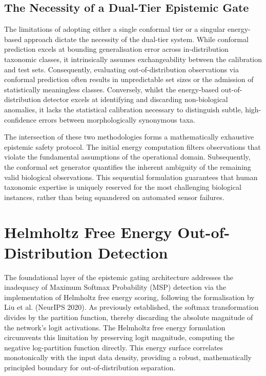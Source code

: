 \subsection{The Necessity of a Dual-Tier Epistemic Gate}

The limitations of adopting either a single conformal tier or a singular energy-based approach dictate the necessity of the dual-tier system. While conformal prediction excels at bounding generalisation error across in-distribution taxonomic classes, it intrinsically assumes exchangeability between the calibration and test sets. Consequently, evaluating out-of-distribution observations via conformal prediction often results in unpredictable set sizes or the admission of statistically meaningless classes. Conversely, whilst the energy-based out-of-distribution detector excels at identifying and discarding non-biological anomalies, it lacks the statistical calibration necessary to distinguish subtle, high-confidence errors between morphologically synonymous taxa.

The intersection of these two methodologies forms a mathematically exhaustive epistemic safety protocol. The initial energy computation filters observations that violate the fundamental assumptions of the operational domain. Subsequently, the conformal set generator quantifies the inherent ambiguity of the remaining valid biological observations. This sequential formulation guarantees that human taxonomic expertise is uniquely reserved for the most challenging biological instances, rather than being squandered on automated sensor failures.

\section{Helmholtz Free Energy Out-of-Distribution Detection}
\label{sec:helmholtz_energy_ood}

The foundational layer of the epistemic gating architecture addresses the inadequacy of Maximum Softmax Probability (MSP) detection via the implementation of Helmholtz free energy scoring, following the formalisation by Liu et al. (NeurIPS 2020). As previously established, the softmax transformation divides by the partition function, thereby discarding the absolute magnitude of the network's logit activations. The Helmholtz free energy formulation circumvents this limitation by preserving logit magnitude, computing the negative log-partition function directly. This energy surface correlates monotonically with the input data density, providing a robust, mathematically principled boundary for out-of-distribution separation.


